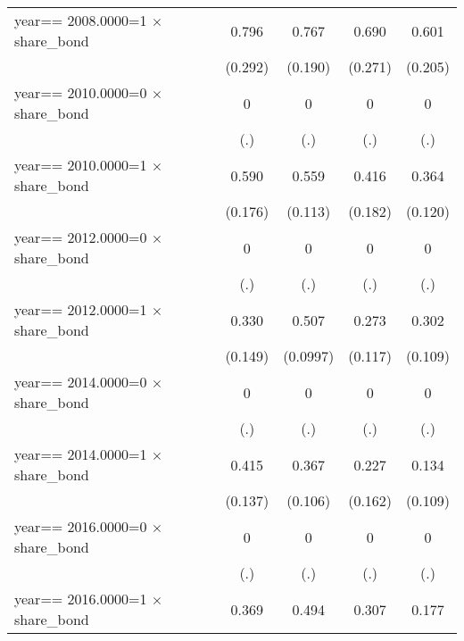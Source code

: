 \begin{table}[htbp]
\begin{tabular}{l*{4}{c}}
\addlinespace
year==  2008.0000=1 $\times$ share\_bond&    0.796\sym{***}&    0.767\sym{***}&    0.690\sym{**} &    0.601\sym{***}\\
                &  (0.292)         &  (0.190)         &  (0.271)         &  (0.205)         \\
\addlinespace
year==  2010.0000=0 $\times$ share\_bond&        0         &        0         &        0         &        0         \\
                &      (.)         &      (.)         &      (.)         &      (.)         \\
\addlinespace
year==  2010.0000=1 $\times$ share\_bond&    0.590\sym{***}&    0.559\sym{***}&    0.416\sym{**} &    0.364\sym{***}\\
                &  (0.176)         &  (0.113)         &  (0.182)         &  (0.120)         \\
\addlinespace
year==  2012.0000=0 $\times$ share\_bond&        0         &        0         &        0         &        0         \\
                &      (.)         &      (.)         &      (.)         &      (.)         \\
\addlinespace
year==  2012.0000=1 $\times$ share\_bond&    0.330\sym{**} &    0.507\sym{***}&    0.273\sym{**} &    0.302\sym{***}\\
                &  (0.149)         & (0.0997)         &  (0.117)         &  (0.109)         \\
\addlinespace
year==  2014.0000=0 $\times$ share\_bond&        0         &        0         &        0         &        0         \\
                &      (.)         &      (.)         &      (.)         &      (.)         \\
\addlinespace
year==  2014.0000=1 $\times$ share\_bond&    0.415\sym{***}&    0.367\sym{***}&    0.227         &    0.134         \\
                &  (0.137)         &  (0.106)         &  (0.162)         &  (0.109)         \\
\addlinespace
year==  2016.0000=0 $\times$ share\_bond&        0         &        0         &        0         &        0         \\
                &      (.)         &      (.)         &      (.)         &      (.)         \\
\addlinespace
year==  2016.0000=1 $\times$ share\_bond&    0.369\sym{**} &    0.494\sym{***}&    0.307\sym{**} &    0.177         \\

\end{tabular}
\end{table}
